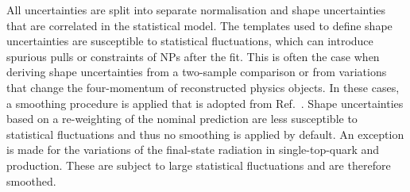All uncertainties are split into separate normalisation and shape uncertainties
that are correlated in the statistical model. The templates used to define shape
uncertainties are susceptible to statistical fluctuations, which can introduce
spurious pulls or constraints of NPs after the fit. This is often the case when
deriving shape uncertainties from a two-sample comparison or from variations
that change the four-momentum of reconstructed physics objects. In these cases,
a smoothing procedure is applied that is adopted from
Ref.~\cite{HIGG-2013-23}. Shape uncertainties based on a re-weighting of the
nominal prediction are less susceptible to statistical fluctuations and thus no
smoothing is applied by default. An exception is made for the variations of the
final-state radiation in single-top-quark and \ttbar production. These are
subject to large statistical fluctuations and are therefore smoothed.



